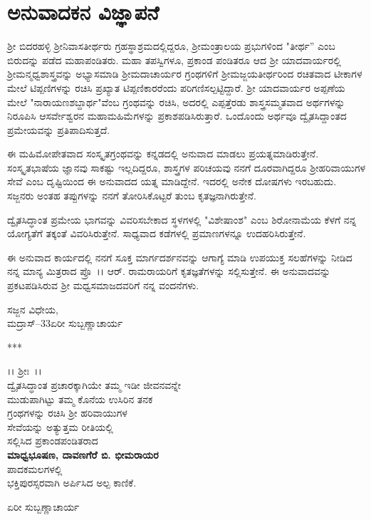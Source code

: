 
\chapter*{ಅನುವಾದಕನ ವಿಜ್ಞಾಪನೆ}

 ಶ‍್ರೀ ಬಿದರಹಳ್ಳಿ ಶ‍್ರೀನಿವಾಸತೀರ್ಥರು ಗ್ರಹಸ್ಥಾಶ್ರಮದಲ್ಲಿದ್ದರೂ, ಶ‍್ರೀಮಂತ್ರಾಲಯ ಪ್ರಭು\-ಗಳಿಂದ "ತೀರ್ಥ'' ಎಂಬ ಬಿರುದನ್ನು ಪಡೆದ ಮಹಾಪಂಡಿತರು. ಮಹಾ ತಪಸ್ವಿ\-ಗಳೂ, ಪ್ರಕಾಂಡ ಪಂಡಿತರೂ ಆದ ಶ‍್ರೀ ಯಾದವಾರ್ಯರಲ್ಲಿ ಶ‍್ರೀಮನ್ಮಧ್ವಶಾಸ್ತ್ರವನ್ನು ಅಭ್ಯಾಸ\-ಮಾಡಿ ಶ‍್ರೀಮದಾಚಾರ್ಯರ ಗ್ರಂಥಗಳಿಗೆ ಶ‍್ರೀಮಜ್ಜಯತೀರ್ಥರಿಂದ ರಚಿತವಾದ ಟೀಕಾ\-ಗಳ ಮೇಲೆ ಟಿಪ್ಪಣಿಗಳನ್ನು ರಚಿಸಿ ಪ್ರಖ್ಯಾತ ಟಿಪ್ಪಣಿಕಾರರೆಂದು ಪರಿಗಣಿಸಲ್ಪಟ್ಟಿದ್ದಾರೆ. ಶ‍್ರೀ ಯಾದವಾರ್ಯರ ಅಪ್ಪಣೆಯ ಮೇಲೆ "ನಾರಾಯಣಶಬ್ದಾರ್ಥ"ವೆಂಬ ಗ್ರಂಥವನ್ನು ರಚಿಸಿ, ಅದರಲ್ಲಿ ಎಪ್ಪತ್ತೆರಡು ಶಾಸ್ತ್ರಸಮ್ಮತವಾದ ಅರ್ಥಗಳನ್ನು ನಿರೂಪಿಸಿ ಆ\break ಸರ್ವೇಶ್ವರನ ಮಹಾಮಹಿಮೆಗಳನ್ನು ಪ್ರಕಾಶಪಡಿಸಿರುತ್ತಾರೆ. ಒಂದೊಂದು ಅರ್ಥವೂ ದ್ವೈತ\-ಸಿದ್ದಾಂತದ ಪ್ರಮೇಯವನ್ನು ಪ್ರತಿಪಾದಿಸುತ್ತದೆ.

ಈ ಮಹಿಮೋಪೇತವಾದ ಸಂಸ್ಕೃತಗ್ರಂಥವನ್ನು ಕನ್ನಡದಲ್ಲಿ ಅನುವಾದ ಮಾಡಲು ಪ್ರಯತ್ನ\-ಮಾಡಿರುತ್ತೇನೆ. ಸಂಸ್ಕೃತಭಾಷೆಯ ಜ್ಞಾನವು ಸಾಕಷ್ಟು ಇಲ್ಲದಿದ್ದರೂ, ಶಾಸ್ತ್ರಗಳ ಪರಿ\-ಚಯವು ನನಗೆ ದೂರವಾಗಿದ್ದರೂ ಶ‍್ರೀಹರಿವಾಯುಗಳ ಸೇವೆ ಎಂಬ ದೃಷ್ಟಿಯಿಂದ ಈ ಅನುವಾದದ ಯತ್ನ ಮಾಡಿದ್ದೇನೆ. ಇದರಲ್ಲಿ ಅನೇಕ ದೋಷಗಳು ಇರಬಹುದು. ಸಜ್ಜನರು ಅಂತಹ ತಪ್ಪುಗಳನ್ನು ನನಗೆ ತೋರಿಸಿಕೊಟ್ಟರೆ ತುಂಬ ಕೃತಜ್ಞನಾಗಿರುತ್ತೇನೆ.

ದ್ವೈತಸಿದ್ಧಾಂತ ಪ್ರಮೇಯ ಭಾಗವನ್ನು ವಿವರಿಸಬೇಕಾದ ಸ್ಥಳಗಳಲ್ಲಿ "ವಿಶೇಷಾಂಶ" ಎಂಬ ಶಿರೋನಾಮೆಯ ಕೆಳಗೆ ನನ್ನ ಯೋಗ್ಯತೆಗೆ ತಕ್ಕಂತೆ ವಿವರಿಸಿರುತ್ತೇನೆ. ಸಾಧ್ಯವಾದ ಕಡೆ\-ಗಳಲ್ಲಿ ಪ್ರಮಾಣಗಳನ್ನೂ ಉದಹರಿಸಿರುತ್ತೇನೆ.

\newpage

ಈ ಅನುವಾದ ಕಾರ್ಯದಲ್ಲಿ ನನಗೆ ಸೂಕ್ತ ಮಾರ್ಗದರ್ಶನವನ್ನು ಆಗಾಗ್ಯೆ ಮಾಡಿ ಉಪಯುಕ್ತ ಸಲಹೆಗಳನ್ನು ನೀಡಿದ ನನ್ನ ಮಾನ್ಯ ಮಿತ್ರರಾದ ಪ್ರೊ~।। ಆರ್. ರಾಮರಾಯರಿಗೆ ಕೃತ\-ಜ್ಞತೆಗಳನ್ನು ಸಲ್ಲಿಸುತ್ತೇನೆ. ಈ ಅನುವಾದವನ್ನು ಪ್ರಕಟಪಡಿಸಿರುವ ಶ‍್ರೀ ಮಧ್ವಸಮಾಜ\-ದವರಿಗೆ ನನ್ನ ವಂದನೆಗಳು.

\vskip 1cm

\begin{flushleft}
\hfill ಸಜ್ಜನ ವಿಧೇಯ,\\ಮದ್ರಾಸ್–33\hfill ಏರೀ ಸುಬ್ಬಣ್ಣಾಚಾರ್ಯ
\end{flushleft}

\begin{center}
***
\end{center}

\newpage

\phantom{}

\vfill

\begin{center}
।। ಶ‍್ರೀಃ~।।\\ ದ್ವೈತಸಿದ್ಧಾಂತ ಪ್ರಚಾರಕ್ಕಾಗಿಯೇ ತಮ್ಮ ಇಡೀ ಜೀವನವನ್ನೇ\\ ಮುಡುಪಾಗಿಟ್ಟು ತಮ್ಮ ಕೊನೆಯ ಉಸಿರಿನ ತನಕ\\ ಗ್ರಂಥಗಳನ್ನು ರಚಿಸಿ ಶ‍್ರೀ ಹರಿವಾಯುಗಳ\\ ಸೇವೆಯನ್ನು ಅತ್ಯುತ್ತಮ ರೀತಿಯಲ್ಲಿ\\ ಸಲ್ಲಿಸಿದ ಪ್ರಕಾಂಡಪಂಡಿತರಾದ\\\textbf{ಮಾಧ್ವಭೂಷಣ, ದಾವಣಗೆರೆ ಬಿ. ಭೀಮರಾಯರ}\\ ಪಾದಕಮಲಗಳಲ್ಲಿ\\ ಭಕ್ತಿಪುರಸ್ಸರವಾಗಿ ಅರ್ಪಿಸಿದ ಅಲ್ಪ ಕಾಣಿಕೆ.
\end{center}

\begin{flushright}
ಏರೀ ಸುಬ್ಬಣ್ಣಾಚಾರ್ಯ
\end{flushright}

